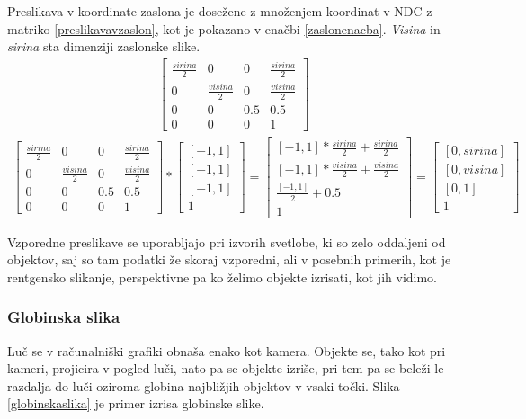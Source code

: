 \documentclass[a4paper, 12pt]{book}
\begin{document}
Preslikava v koordinate zaslona je dosežene z množenjem koordinat v NDC z matriko \ref{preslikavavzaslon}, kot je pokazano v enačbi \ref{zaslonenacba}. \emph{Visina} in \emph{sirina} sta dimenziji zaslonske slike.
\begin{align}
\begin{bmatrix}
\frac{sirina}{2} & 0 & 0 & \frac{sirina}{2}\\ 
0 & \frac{visina}{2} & 0 & \frac{visina}{2}\\ 
0 & 0 & 0.5 & 0.5 \\ 
0 & 0 & 0 & 1
\end{bmatrix}
\label{preslikavavzaslon}
\end{align}
\begin{align}
\begin{bmatrix}
\frac{sirina}{2} & 0 & 0 & \frac{sirina}{2}\\ 
0 & \frac{visina}{2} & 0 & \frac{visina}{2}\\ 
0 & 0 & 0.5 & 0.5 \\ 
0 & 0 & 0 & 1
\end{bmatrix}
*
\begin{bmatrix}
[-1, 1] \\ [-1, 1] \\ [-1, 1] \\ 1
\end{bmatrix}
=
\begin{bmatrix}
[-1, 1]*\frac{sirina}{2} + \frac{sirina}{2}\\
[-1, 1]*\frac{visina}{2} + \frac{visina}{2}\\
\frac{[-1, 1]}{2} + 0.5 \\
1
\end{bmatrix}
=
\begin{bmatrix}
[0, sirina] \\
[0, visina] \\
[0, 1] \\
1
\end{bmatrix}
\label{zaslonenacba}
\end{align}

Vzporedne preslikave se uporabljajo pri izvorih svetlobe, ki so zelo oddaljeni od objektov, saj so tam podatki že skoraj vzporedni, ali v posebnih primerih, kot je rentgensko slikanje, perspektivne pa ko želimo objekte izrisati, kot jih vidimo. 

\subsubsection*{Globinska slika}
Luč se v računalniški grafiki obnaša enako kot kamera. Objekte se, tako kot pri kameri, projicira v pogled luči, nato pa se objekte izriše, pri tem pa se beleži le razdalja do luči oziroma globina najbližjih objektov v vsaki točki. Slika \ref{globinskaslika} je primer izrisa globinske slike.
\end{document}
